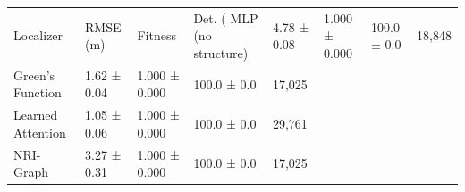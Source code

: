 \begin{tabular}{lllll}
\toprule
Localizer & RMSE (m) & Fitness & Det. (%
\midrule
MLP (no structure) & 4.78 ± 0.08 & 1.000 ± 0.000 & 100.0 ± 0.0 & 18,848 \\
Green's Function & 1.62 ± 0.04 & 1.000 ± 0.000 & 100.0 ± 0.0 & 17,025 \\
Learned Attention & 1.05 ± 0.06 & 1.000 ± 0.000 & 100.0 ± 0.0 & 29,761 \\
NRI-Graph & 3.27 ± 0.31 & 1.000 ± 0.000 & 100.0 ± 0.0 & 17,025 \\
\bottomrule
\end{tabular}
